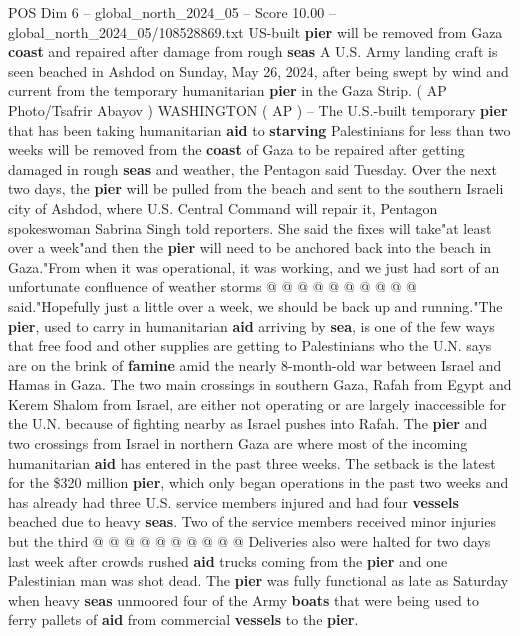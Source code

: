 \begin{textsample}{POS Dim 6 – global\_north\_2024\_05 – Score 10.00 – global\_north\_2024\_05/108528869.txt}  \label{ex:f6_pos_144}
US-built \textbf{pier} will be removed from Gaza \textbf{coast} and repaired after damage from rough \textbf{seas} A U.S.
Army landing craft is seen beached in Ashdod on Sunday, May 26, 2024, after being swept by wind and current from the temporary humanitarian \textbf{pier} in the Gaza Strip. ( AP Photo/Tsafrir Abayov ) WASHINGTON ( AP ) -- The U.S.-built temporary \textbf{pier} that has been taking humanitarian \textbf{aid} to \textbf{starving} Palestinians for less than two weeks will be removed from the \textbf{coast} of Gaza to be repaired after getting damaged in rough \textbf{seas} and weather, the Pentagon said Tuesday.
Over the next two days, the \textbf{pier} will be pulled from the beach and sent to the southern Israeli city of Ashdod, where U.S.
Central Command will repair it, Pentagon spokeswoman Sabrina Singh told reporters.
She said the fixes will take"at least over a week"and then the \textbf{pier} will need to be anchored back into the beach in Gaza."From when it was operational, it was working, and we just had sort of an unfortunate confluence of weather storms @ @ @ @ @ @ @ @ @ @ said."Hopefully just a little over a week, we should be back up and running."The \textbf{pier}, used to carry in humanitarian \textbf{aid} arriving by \textbf{sea}, is one of the few ways that free food and other supplies are getting to Palestinians who the U.N. says are on the brink of \textbf{famine} amid the nearly 8-month-old war between Israel and Hamas in Gaza.
The two main crossings in southern Gaza, Rafah from Egypt and Kerem Shalom from Israel, are either not operating or are largely inaccessible for the U.N. because of fighting nearby as Israel pushes into Rafah.
The \textbf{pier} and two crossings from Israel in northern Gaza are where most of the incoming humanitarian \textbf{aid} has entered in the past three weeks.
The setback is the latest for the \$320 million \textbf{pier}, which only began operations in the past two weeks and has already had three U.S. service members injured and had four \textbf{vessels} beached due to heavy \textbf{seas}.
Two of the service members received minor injuries but the third @ @ @ @ @ @ @ @ @ @ Deliveries also were halted for two days last week after crowds rushed \textbf{aid} trucks coming from the \textbf{pier} and one Palestinian man was shot dead.
The \textbf{pier} was fully functional as late as Saturday when heavy \textbf{seas} unmoored four of the Army \textbf{boats} that were being used to ferry pallets of \textbf{aid} from commercial \textbf{vessels} to the \textbf{pier}.

\end{textsample}
